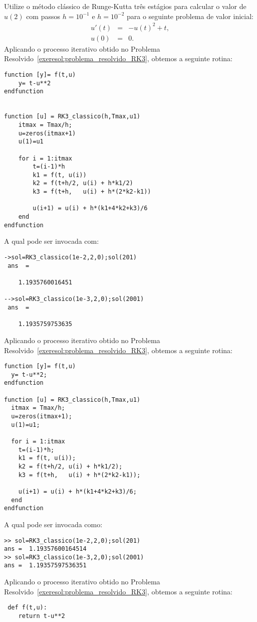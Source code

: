 \begin{exeresol} Utilize o método clássico de Runge-Kutta três estágios para calcular o valor de $u(2)$ com passos $h=10^{-1}$ e $h=10^{-2}$ para o seguinte problema de valor inicial:
\begin{eqnarray}
 u'(t)&=& -u(t)^2 + t,\\
 u(0) &=&0.
\end{eqnarray}
\ifisscilab
Aplicando o processo iterativo obtido no Problema Resolvido~\ref{exeresol:problema_resolvido_RK3}, obtemos a seguinte rotina:
\begin{verbatim}
function [y]= f(t,u)
    y= t-u**2
endfunction


function [u] = RK3_classico(h,Tmax,u1)
    itmax = Tmax/h;
    u=zeros(itmax+1)
    u(1)=u1

    for i = 1:itmax
        t=(i-1)*h
        k1 = f(t, u(i))
        k2 = f(t+h/2, u(i) + h*k1/2)
        k3 = f(t+h,   u(i) + h*(2*k2-k1))

        u(i+1) = u(i) + h*(k1+4*k2+k3)/6
    end
endfunction
 \end{verbatim}
A qual pode ser invocada com:
\begin{verbatim}
->sol=RK3_classico(1e-2,2,0);sol(201)
 ans  =

    1.1935760016451

-->sol=RK3_classico(1e-3,2,0);sol(2001)
 ans  =

    1.1935759753635
\end{verbatim}


\fi
\ifisoctave
Aplicando o processo iterativo obtido no Problema Resolvido~\ref{exeresol:problema_resolvido_RK3}, obtemos a seguinte rotina:
\begin{verbatim}
function [y]= f(t,u)
  y= t-u**2;
endfunction

function [u] = RK3_classico(h,Tmax,u1)
  itmax = Tmax/h;
  u=zeros(itmax+1);
  u(1)=u1;

  for i = 1:itmax
    t=(i-1)*h;
    k1 = f(t, u(i));
    k2 = f(t+h/2, u(i) + h*k1/2);
    k3 = f(t+h,   u(i) + h*(2*k2-k1));

    u(i+1) = u(i) + h*(k1+4*k2+k3)/6;
  end
endfunction
 \end{verbatim}
A qual pode ser invocada como:
\begin{verbatim}
>> sol=RK3_classico(1e-2,2,0);sol(201)
ans =  1.19357600164514
>> sol=RK3_classico(1e-3,2,0);sol(2001)
ans =  1.19357597536351
\end{verbatim}
\fi

\ifispython
Aplicando o processo iterativo obtido no Problema Resolvido~\ref{exeresol:problema_resolvido_RK3}, obtemos a seguinte rotina:
\begin{verbatim}
 def f(t,u):
	return t-u**2



\end{verbatim}
\end{exeresol}
